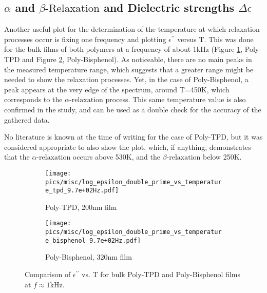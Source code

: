 
\subsection{$\alpha$ and $\beta\text{-Relaxation}$ and Dielectric strengths $\Delta\epsilon$}
Another useful plot for the determination of the temperature at which relaxation processes occur is fixing one frequency and plotting $\epsilon^{\prime\prime}$ versus T. This was done for the bulk films of both polymers at a frequency of about 1kHz (Figure \ref{epsvsttpd}, Poly-TPD and Figure \ref{epsvstbisph}, Poly-Bisphenol).
As noticeable, there are no main peaks in the measured temperature range, which suggests that a greater range might be needed to show the relaxation processes. Yet, in the case of Poly-Bisphenol, a peak appears at the very edge of the spectrum, around T=450K, which corresponds to the $\alpha\text{-relaxation}$ process. This same temperature value is also confirmed in the study, and can be used as a double check for the accuracy of the gathered data. %

No literature is known at the time of writing for the case of Poly-TPD, but it was considered appropriate to also show the plot, which, if anything, demonstrates that the $\alpha\text{-relaxation}$ occurs above 530K, and the $\beta\text{-relaxation}$ below 250K.

\begin{figure}[!htb]
\centering
\begin{subfigure}[t]{.5\textwidth}
  \centering
  \texttt{[image: pics/misc/log\_epsilon\_double\_prime\_vs\_temperature\_tpd\_9.7e+02Hz.pdf]}
  \caption{Poly-TPD, 200nm film}
  \label{epsvsttpd}
\end{subfigure}%
\begin{subfigure}[t]{.5\textwidth}
  \centering
  \texttt{[image: pics/misc/log\_epsilon\_double\_prime\_vs\_temperature\_bisphenol\_9.7e+02Hz.pdf]}
  \caption{Poly-Bisphenol, 320nm film}
  \label{epsvstbisph}
\end{subfigure}
\caption{Comparison of $\epsilon^{\prime\prime}$ vs. T for bulk Poly-TPD and Poly-Bisphenol films at $f \approx 1\text{kHz}$.}
\label{epsvstcomparison}
\end{figure}


